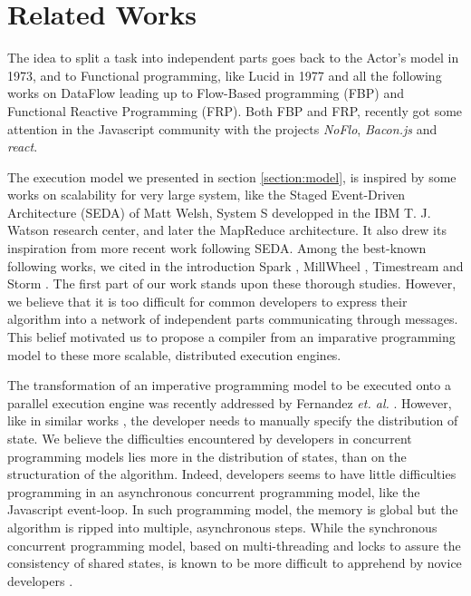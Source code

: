 \section{Related Works} \label{section:related}

The idea to split a task into independent parts goes back to the Actor's model\cite{Hewitt1973} in 1973, and to Functional programming, like Lucid\cite{Ashcroft1977} in 1977 and all the following works on DataFlow leading up to Flow-Based programming (FBP) and Functional Reactive Programming (FRP).
Both FBP and FRP, recently got some attention in the Javascript community with the projects \textit{NoFlo}, \textit{Bacon.js} and \textit{react}.

The execution model we presented in section \ref{section:model}, is inspired by some works on scalability for very large system, like the Staged Event-Driven Architecture (SEDA) of Matt Welsh\cite{Welsh2000}, System S developped in the IBM T. J. Watson research center\cite{Jain2006,Wu2007}, and later the MapReduce architecture\cite{Dean2008}.
It also drew its inspiration from more recent work following SEDA.
Among the best-known following works, we cited in the introduction Spark \cite{Zaharia2010, Zaharia2012}, MillWheel \cite{Akidau2013}, Timestream \cite{Qian2013} and Storm \cite{Toshniwal2014}.
The first part of our work stands upon these thorough studies.
However, we believe that it is too difficult for common developers to express their algorithm into a network of independent parts communicating through messages.
This belief motivated us to propose a compiler from an imparative programming model to these more scalable, distributed execution engines.


The transformation of an imperative programming model to be executed onto a parallel execution engine was recently addressed by Fernandez \textit{et. al.} \cite{Fernandez2014a}.
However, like in similar works \cite{Mitchell2012,Power2010}, the developer needs to manually specify the distribution of state.
We believe the difficulties encountered by developers in concurrent programming models lies more in the distribution of states, than on the structuration of the algorithm.
Indeed, developers seems to have little difficulties programming in an asynchronous concurrent programming model, like the Javascript event-loop.
In such programming model, the memory is global but the algorithm is ripped into multiple, asynchronous steps.
While the synchronous concurrent programming model, based on multi-threading and locks to assure the consistency of shared states, is known to be more difficult to apprehend by novice developers \cite{Adya2002}.


